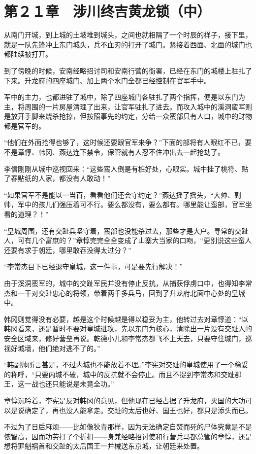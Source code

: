 \section{第２１章　涉川终吉黄龙锁（中）}

从南门开城，到上城的土坡堆到城头，之间也就相隔了一个时辰的样子，接下里，就是一队先锋冲上东门城头，兵不血刃的打开了城门。紧接着西面、北面的城门也都陆续被打开。

到了傍晚的时候，安南经略招讨司和安南行营的衙署，已经在东门的城楼上驻扎了下来。升龙府的四座城门、加上两个水门全都已经控制在官军手中。

军中的主力，也都进驻了城中，除了四座城门各驻扎了两个指挥，便是以东门为主，将周围的一片房屋清理了出来，让官军驻扎了进去。而攻入城中的溪洞蛮军则是放开手脚来烧杀抢掠，但按照事先的约定，分给一众蛮部只有人口，城中的财物都是官军的。

“他们在外面抢得也够了，这时候还要跟官军来争？”下面的部将有人眼红不已，要不是章惇、韩冈、燕达连下禁令，保管就有人忍不住冲出去一起抢劫了。

李信刚刚从城中巡视回来：“这些蛮人倒是有桩好处，心眼实。城中挂了桃符、贴了春贴纸的人家，都没有人敢动！”

“如果官军不是能以一当百，看看他们还会守约定？”燕达摇了摇头，“大帅、副帅，军中的孩儿们强压着可不行。要么都没有，要么都有。哪里能让蛮部，官军坐看的道理？！”

“皇城周围，还有交趾兵坚守着，蛮部也没能杀过去，那些才是大户。寻常的交趾人，可有几个富庶的？”章惇完完全全变成了山寨大当家的口吻，“更别说这些蛮人还要有求于朝廷，哪里敢吞没得太过分？”

“李常杰目下已经退守皇城，这一件事，可是要先行解决！”

由于溪洞蛮军的，城中的交趾军民并没有停止反抗，从捕获俘虏口中，也得知李常杰和一干对交趾忠心的将领，带着两千多兵马，回到了升龙府北面中心处的皇城中。

韩冈则觉得没有必要，越是这个时候越是得以稳妥为主，他转过去对章惇道：“以韩冈看来，还是暂时不要对皇城进攻，先以东门为核心，清除出一片没有交趾人的安全区域来，修好营垒再说。乾德小儿和李常杰都飞不上天去，只要守住城门，巡视好城墙，他们绝对逃不了的。”

“韩副帅所言甚是，不过内城也不能放着不理。”李宪对交趾的皇城使用了一个稳妥的称呼，“只要内城不破，城中的反抗就不会停止。而且不捉到李常杰和交趾郡王，这一战也还只能说是未竟全功。”

章惇沉吟着，李宪是反对韩冈的意见，但他现在已经占据了升龙府，灭国的大功可以是说确定了，再也没人能拿走。交趾的太后也好、国王也好，都只是添头而已。

不过为了日后麻烦——比如像狄青那样，因为无法确定自焚而死的尸体究竟是不是侬智高，因而功劳打了个折扣——身兼经略招讨使和行营兵马都总管的章惇，还是想将罪魁祸首和交趾的太后国王一并械送东京城，让朝廷来处置。

